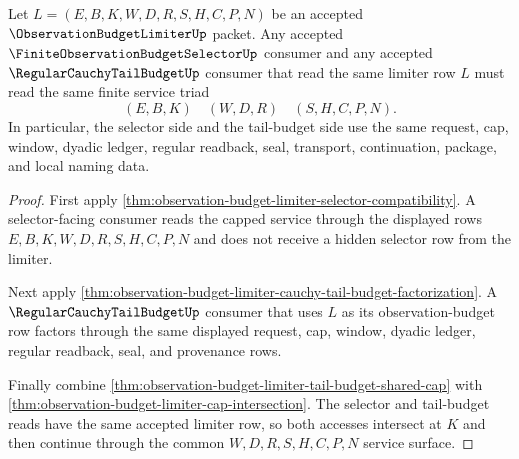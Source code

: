 \begin{theorem}
\label{thm:observation-budget-limiter-selector-tail-budget-compatibility}
Let $L=(E,B,K,W,D,R,S,H,C,P,N)$ be an accepted $\ObservationBudgetLimiterUp$ packet. Any accepted $\FiniteObservationBudgetSelectorUp$ consumer and any accepted $\RegularCauchyTailBudgetUp$ consumer that read the same limiter row $L$ must read the same finite service triad
$$
(E,B,K) \quad (W,D,R) \quad (S,H,C,P,N).
$$
In particular, the selector side and the tail-budget side use the same request, cap, window, dyadic ledger, regular readback, seal, transport, continuation, package, and local naming data.
\end{theorem}
\begin{proof}
First apply \autoref{thm:observation-budget-limiter-selector-compatibility}. A selector-facing consumer reads the capped service through the displayed rows $E,B,K,W,D,R,S,H,C,P,N$ and does not receive a hidden selector row from the limiter.

Next apply \autoref{thm:observation-budget-limiter-cauchy-tail-budget-factorization}. A $\RegularCauchyTailBudgetUp$ consumer that uses $L$ as its observation-budget row factors through the same displayed request, cap, window, dyadic ledger, regular readback, seal, and provenance rows.

Finally combine \autoref{thm:observation-budget-limiter-tail-budget-shared-cap} with \autoref{thm:observation-budget-limiter-cap-intersection}. The selector and tail-budget reads have the same accepted limiter row, so both accesses intersect at $K$ and then continue through the common $W,D,R,S,H,C,P,N$ service surface.
\end{proof}

